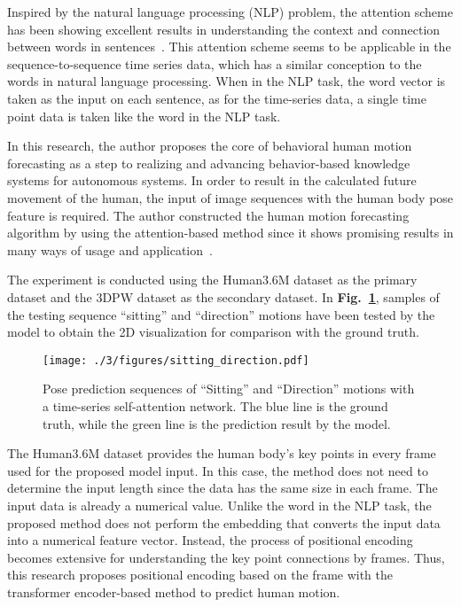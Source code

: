 Inspired by the natural language processing (NLP) problem,
the attention scheme has been showing excellent results in understanding the context and connection between words in sentences~\cite{bert_understanding}.
This attention scheme seems to be applicable in the sequence-to-sequence time series data, which has a similar conception to the words in natural language processing. When in the NLP task, the word vector is taken as the input on each sentence, as for the time-series data, a single time point data is taken like the word in the NLP task.

In this research, the author proposes the core of behavioral human motion forecasting as a step to realizing and advancing behavior-based knowledge systems for autonomous systems. 
In order to result in the calculated future movement of the human, the input of image sequences with the human body pose feature is required.
The author constructed the human motion forecasting algorithm by using the attention-based method since it shows promising results in many ways of usage and application~\cite{visionTransformer, vaswani2017, neo2020, vitae, bert_understanding, bert-aggression, mobilevit}.

The experiment is conducted using the Human3.6M dataset as the primary dataset and the 3DPW dataset as the secondary dataset.
In \textbf{Fig.~\ref{fig:sitting400}}, samples of the testing sequence ``sitting'' and ``direction'' motions have been tested by the model to obtain the 2D visualization for comparison with the ground truth.
\begin{figure}
    \centering
    \texttt{[image: ./3/figures/sitting\_direction.pdf]}
    \caption{Pose prediction sequences of ``Sitting'' and ``Direction'' motions with a time-series self-attention network. The blue line is the ground truth, while the green line is the prediction result by the model.}
    \label{fig:sitting400}
\end{figure}
The Human3.6M dataset provides the human body's key points in every frame used for the proposed model input.
In this case, the method does not need to determine the input length since the data has the same size in each frame.
The input data is already a numerical value. Unlike the word in the NLP task, the proposed method does not perform the embedding that converts the input data into a numerical feature vector.
Instead, the process of positional encoding becomes extensive for understanding the key point connections by frames.
Thus, this research proposes positional encoding based on the frame with the transformer encoder-based method to predict human motion.

